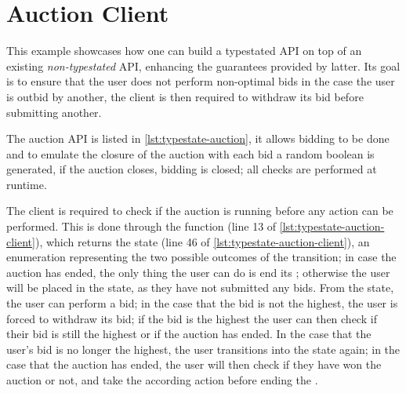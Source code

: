 \section{Auction Client}\label{sec:case-study:auction}

This example showcases how one can build a typestated API on top of an existing \emph{non-typestated} API,
enhancing the guarantees provided by latter.
Its goal is to ensure that the user does not perform non-optimal bids 
in the case the user is outbid by another, the client is then required to withdraw its bid before submitting another.

The auction API is listed in \autoref{lst:typestate-auction},
it allows bidding to be done and to emulate the closure of the auction with each bid a random boolean is generated,
if the auction closes, bidding is closed; all checks are performed at runtime.

The client is required to check if the auction is running before any action can be performed.
This is done through the  function (line 13 of \autoref{lst:typestate-auction-client}),
which returns the \textcolor{structblue}{} state (line 46 of \autoref{lst:typestate-auction-client}),
an enumeration representing the two possible outcomes of the transition;
in case the auction has ended, the only thing the user can do is end its ;
otherwise the user will be placed in the \textcolor{structblue}{} state, as they have not submitted any bids.
From the \textcolor{structblue}{} state, the user can perform a bid;
in the case that the bid is not the highest, the user is forced to withdraw its bid;
if the bid is the highest the user can then check if their bid is still the highest or if the auction has ended.
In the case that the user's bid is no longer the highest, the user transitions into the \textcolor{structblue}{} state again;
in the case that the auction has ended, the user will then check if they have won the auction or not,
and take the according action before ending the .


